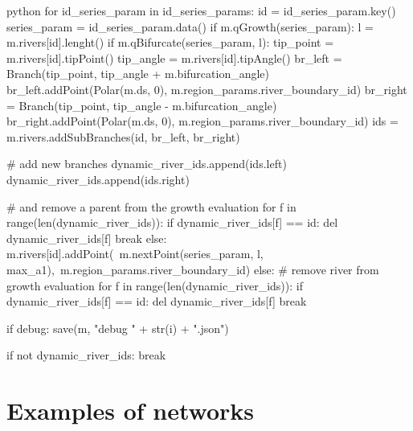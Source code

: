 \documentclass[]{pracamgr}
\begin{document}
\begin{mintedbox}{python}
          for id_series_param in id_series_params:
              id = id_series_param.key()
              series_param = id_series_param.data()
              if m.qGrowth(series_param):
                  l = m.rivers[id].lenght()
                  if m.qBifurcate(series_param, l):
                      tip_point = m.rivers[id].tipPoint()
                      tip_angle = m.rivers[id].tipAngle()
                      br_left = Branch(tip_point, tip_angle + m.bifurcation_angle)
                      br_left.addPoint(Polar(m.ds, 0), m.region_params.river_boundary_id)
                      br_right = Branch(tip_point, tip_angle - m.bifurcation_angle)
                      br_right.addPoint(Polar(m.ds, 0), m.region_params.river_boundary_id)
                      ids = m.rivers.addSubBranches(id, br_left, br_right)

                      # add new branches
                      dynamic_river_ids.append(ids.left)
                      dynamic_river_ids.append(ids.right)

                      # and remove a parent from the growth evaluation
                      for f in range(len(dynamic_river_ids)):
                          if dynamic_river_ids[f] == id:
                              del dynamic_river_ids[f]
                              break
                  else: 
                      m.rivers[id].addPoint(\
                          m.nextPoint(series_param, l, max_a1),\
                          m.region_params.river_boundary_id)
              else:
                  # remove river from growth evaluation
                  for f in range(len(dynamic_river_ids)):
                      if dynamic_river_ids[f] == id:
                          del dynamic_river_ids[f]
                          break

          if debug:
              save(m, "debug " + str(i) + ".json")

          if not dynamic_river_ids:
              break
      \end{mintedbox}

      \section{Examples of networks}
        
\end{document}
